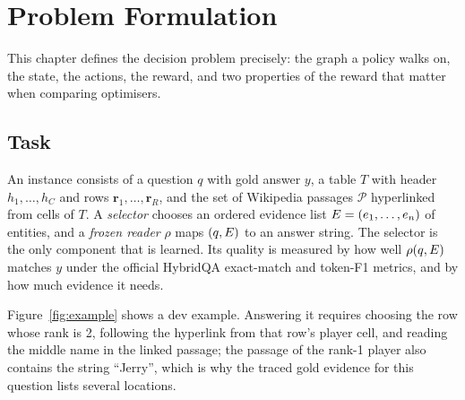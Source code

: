 \chapter{Problem Formulation}
\label{ch:formulation}

This chapter defines the decision problem precisely: the graph a policy walks on, the state, the actions, the reward, and two properties of the reward that matter when comparing optimisers.

\section{Task}

An instance consists of a question $q$ with gold answer $y$, a table $T$ with header $h_1,\dots,h_C$ and rows $\mathbf{r}_1,\dots,\mathbf{r}_R$, and the set of Wikipedia passages $\mathcal{P}$ hyperlinked from cells of $T$. A \emph{selector} chooses an ordered evidence list $E=(e_1,\dots,e_n)$ of entities, and a \emph{frozen reader} $\rho$ maps $(q,E)$ to an answer string. The selector is the only component that is learned. Its quality is measured by how well $\rho(q,E)$ matches $y$ under the official HybridQA exact-match and token-F1 metrics, and by how much evidence it needs.

Figure~\ref{fig:example} shows a dev example. Answering it requires choosing the row whose rank is 2, following the hyperlink from that row's player cell, and reading the middle name in the linked passage; the passage of the rank-1 player also contains the string ``Jerry'', which is why the traced gold evidence for this question lists several locations.

